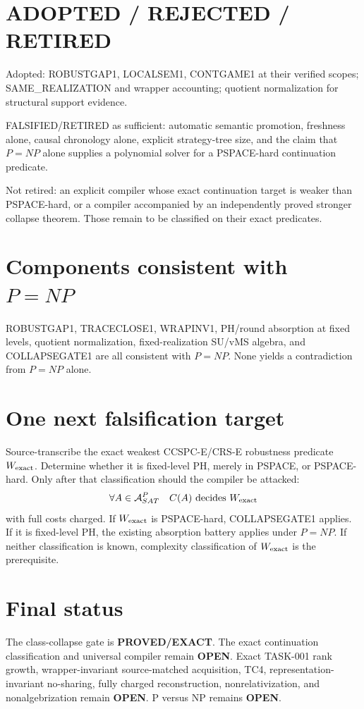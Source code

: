 \documentclass[11pt]{article}
\begin{document}
\section*{ADOPTED / REJECTED / RETIRED}
Adopted: ROBUSTGAP1, LOCALSEM1, CONTGAME1 at their verified scopes; SAME\_REALIZATION and wrapper accounting; quotient normalization for structural support evidence.

FALSIFIED/RETIRED as sufficient: automatic semantic promotion, freshness alone, causal chronology alone, explicit strategy-tree size, and the claim that \(P=NP\) alone supplies a polynomial solver for a PSPACE-hard continuation predicate.

Not retired: an explicit compiler whose exact continuation target is weaker than PSPACE-hard, or a compiler accompanied by an independently proved stronger collapse theorem. Those remain to be classified on their exact predicates.

\section*{Components consistent with \(P=NP\)}
ROBUSTGAP1, TRACECLOSE1, WRAPINV1, PH/round absorption at fixed levels, quotient normalization, fixed-realization SU/vMS algebra, and COLLAPSEGATE1 are all consistent with \(P=NP\). None yields a contradiction from \(P=NP\) alone.

\section*{One next falsification target}
Source-transcribe the exact weakest CCSPC-E/CRS-E robustness predicate \(W_{\rm exact}\). Determine whether it is fixed-level PH, merely in PSPACE, or PSPACE-hard. Only after that classification should the compiler be attacked:
\[
\forall A\in{\cal A}^{P}_{SAT}\quad C(A)\text{ decides }W_{\rm exact}
\]
with full costs charged. If \(W_{\rm exact}\) is PSPACE-hard, COLLAPSEGATE1 applies. If it is fixed-level PH, the existing absorption battery applies under \(P=NP\). If neither classification is known, complexity classification of \(W_{\rm exact}\) is the prerequisite.

\section*{Final status}
The class-collapse gate is \textbf{PROVED/EXACT}. The exact continuation classification and universal compiler remain \textbf{OPEN}. Exact TASK-001 rank growth, wrapper-invariant source-matched acquisition, TC4, representation-invariant no-sharing, fully charged reconstruction, nonrelativization, and nonalgebrization remain \textbf{OPEN}. P versus NP remains \textbf{OPEN}.

\end{document}
